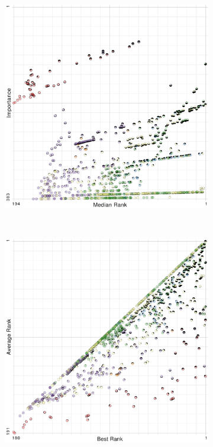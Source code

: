 \begin{figure}[t]
\begin{subfigure}{0.24\linewidth}
\includegraphics[width=\linewidth]{infuse/mi}
\label{subfig:mi}
\end{subfigure}%
~%
\begin{subfigure}{0.24\linewidth}
\includegraphics[width=\linewidth]{infuse/ba}

\end{subfigure}
\end{figure}
